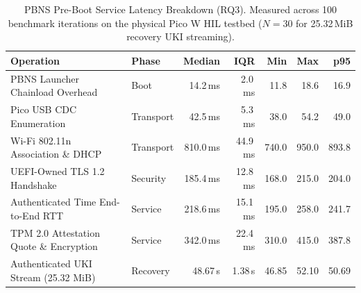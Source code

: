 \begin{table}[t]
\centering
\small
\caption{PBNS Pre-Boot Service Latency Breakdown (RQ3). Measured across 100 benchmark iterations on the physical Pico W HIL testbed ($N=30$ for 25.32\,MiB recovery UKI streaming).}
\label{tab:rq2-latency}
\begin{tabular}{llrrrrr}
\toprule
\textbf{Operation} & \textbf{Phase} & \textbf{Median} & \textbf{IQR} & \textbf{Min} & \textbf{Max} & \textbf{p95} \\
\midrule
PBNS Launcher Chainload Overhead & Boot & 14.2\,ms & 2.0\,ms & 11.8 & 18.6 & 16.9 \\
Pico USB CDC Enumeration & Transport & 42.5\,ms & 5.3\,ms & 38.0 & 54.2 & 49.0 \\
Wi-Fi 802.11n Association \& DHCP & Transport & 810.0\,ms & 44.9\,ms & 740.0 & 950.0 & 893.8 \\
UEFI-Owned TLS 1.2 Handshake & Security & 185.4\,ms & 12.8\,ms & 168.0 & 215.0 & 204.0 \\
Authenticated Time End-to-End RTT & Service & 218.6\,ms & 15.1\,ms & 195.0 & 258.0 & 241.7 \\
TPM 2.0 Attestation Quote \& Encryption & Service & 342.0\,ms & 22.4\,ms & 310.0 & 415.0 & 387.8 \\
Authenticated UKI Stream (25.32 MiB) & Recovery & 48.67\,s & 1.38\,s & 46.85 & 52.10 & 50.69 \\
\bottomrule
\end{tabular}
\end{table}
